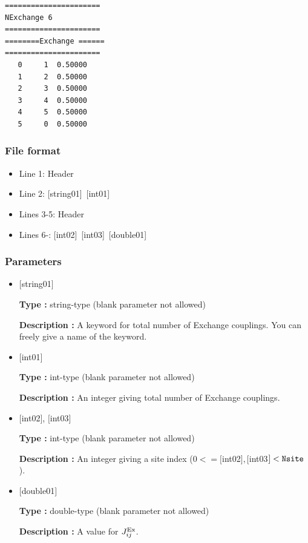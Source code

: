 \begin{minipage}{12.5cm}
\begin{screen}
\begin{verbatim}
====================== 
NExchange 6  
====================== 
========Exchange ====== 
====================== 
   0     1  0.50000
   1     2  0.50000
   2     3  0.50000
   3     4  0.50000
   4     5  0.50000
   5     0  0.50000
\end{verbatim}
\end{screen}
\end{minipage}

\subsubsection{File format}
 \begin{itemize}
   \item  Line 1:  Header
   \item  Line 2:   [string01]~[int01]
   \item  Lines 3-5:  Header
   \item  Lines 6-: 
   [int02]~[int03]~[double01] 
  \end{itemize}
\subsubsection{Parameters}
 \begin{itemize}

   \item  $[$string01$]$
   
    {\bf Type :} string-type (blank parameter not allowed)

   {\bf Description :}  A keyword for total number of Exchange couplings. You can freely give a name of the keyword.

   \item  $[$int01$]$
   
    {\bf Type :} int-type (blank parameter not allowed)

   {\bf Description :} An integer giving total number of Exchange couplings.

  \item  $[$int02$]$, $[$int03$]$
  
 {\bf Type :} int-type (blank parameter not allowed)

{\bf Description :} An integer giving a site index ($0<= [$int02$], [$int03$]<\verb|Nsite|$).
 
 \item  $[$double01$]$
   
   {\bf Type :} double-type (blank parameter not allowed)

  {\bf Description :}   A value for $J_{ij}^{\rm Ex}$.
  
\end{itemize}

